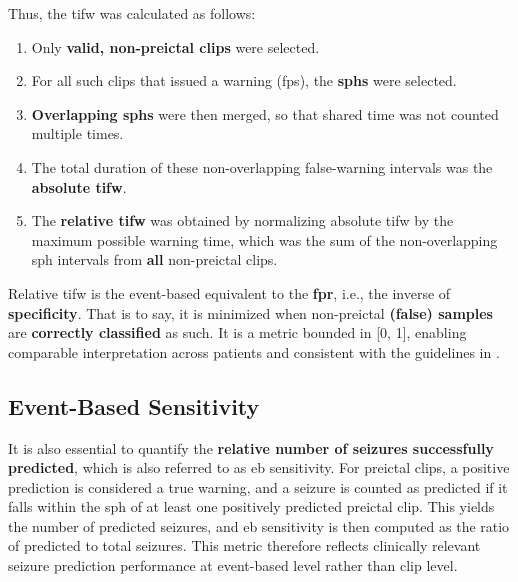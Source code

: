 Thus, the \gls{tifw} was calculated as follows:
\begin{enumerate}
    \item Only \textbf{valid, non-preictal clips} were selected.
    \item For all such clips that issued a warning (\glspl{fp}), the \textbf{\glspl{sph}} were selected.
    \item \textbf{Overlapping \glspl{sph}} were then merged, so that shared time was not counted multiple times.
    \item The total duration of these non-overlapping false-warning intervals was the \textbf{absolute \gls{tifw}}.
    \item The \textbf{relative \gls{tifw}} was obtained by normalizing absolute \gls{tifw} by the maximum possible warning time, which was the sum of the non-overlapping \gls{sph} intervals from \textbf{all} non-preictal clips.
\end{enumerate}
Relative \gls{tifw} is the event-based equivalent to the \textbf{\gls{fpr}}, i.e., the inverse of \textbf{specificity}.
That is to say, it is minimized when non-preictal \textbf{(false) samples} are \textbf{correctly classified} as such.
It is a metric bounded in [0, 1], enabling comparable interpretation across patients and consistent with the guidelines in \textcite{mormann_seizure_2007}.


\subsection{Event-Based Sensitivity} \label{subsec:eb-sensitivity}
It is also essential to quantify the \textbf{relative number of seizures successfully predicted}, which is also referred to as \gls{eb} sensitivity.
For preictal clips, a positive prediction is considered a true warning, and a seizure is counted as predicted if it falls within the \gls{sph} of at least one positively predicted preictal clip.
This yields the number of predicted seizures, and \gls{eb} sensitivity is then computed as the ratio of predicted to total seizures.
This metric therefore reflects clinically relevant seizure prediction performance at event-based level rather than clip level.

